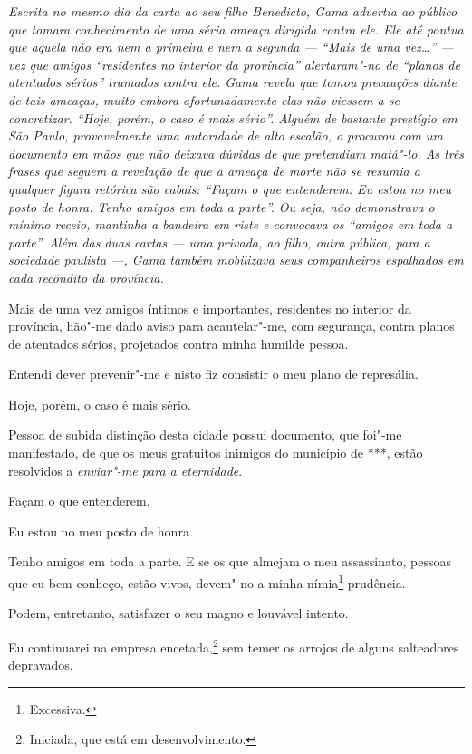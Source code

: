\begin{flushleft}
{\footnotesize\itshape
Escrita no mesmo dia da carta ao seu filho Benedicto, Gama
advertia ao público que tomara conhecimento de uma séria ameaça dirigida
contra ele. Ele até pontua que aquela não era nem a primeira e nem a
segunda --- ``Mais de uma vez\ldots{}'' --- vez que amigos ``residentes no
interior da província'' alertaram"-no de ``planos de atentados sérios''
tramados contra ele. Gama revela que tomou precauções diante de tais
ameaças, muito embora afortunadamente elas não viessem a se concretizar.
``Hoje, porém, o caso é mais sério''. Alguém de bastante prestígio em São
Paulo, provavelmente uma autoridade de alto escalão, o procurou com um
documento em mãos que não deixava dúvidas de que pretendiam matá"-lo. As
três frases que seguem a revelação de que a ameaça de morte não se
resumia a qualquer figura retórica são cabais: ``Façam o que entenderem.
Eu estou no meu posto de honra. Tenho amigos em toda a parte''. Ou seja,
não demonstrava o mínimo receio, mantinha a bandeira em riste e
convocava os ``amigos em toda a parte''. Além das duas cartas --- uma
privada, ao filho, outra pública, para a sociedade paulista ---, Gama
também mobilizava seus companheiros espalhados em cada recôndito da
província.}
\end{flushleft}

Mais de uma vez amigos íntimos e importantes, residentes no interior da
província, hão"-me dado aviso para acautelar"-me, com segurança, contra
planos de atentados sérios, projetados contra minha humilde pessoa.

Entendi dever prevenir"-me e nisto fiz consistir o meu plano de
represália.

Hoje, porém, o caso é mais sério.

Pessoa de subida distinção desta cidade possui documento, que foi"-me
manifestado, de que os meus gratuitos inimigos do município de ***,
estão resolvidos a \emph{enviar"-me para a eternidade}.

Façam o que entenderem.

Eu estou no meu posto de honra.

Tenho amigos em toda a parte. E se os que almejam o meu assassinato,
pessoas que eu bem conheço, estão vivos, devem"-no a minha
nímia\footnote{Excessiva.} prudência.

Podem, entretanto, satisfazer o seu magno e louvável intento.

Eu continuarei na empresa encetada,\footnote{Iniciada, que está em
  desenvolvimento.} sem
temer os arrojos de alguns salteadores depravados.

